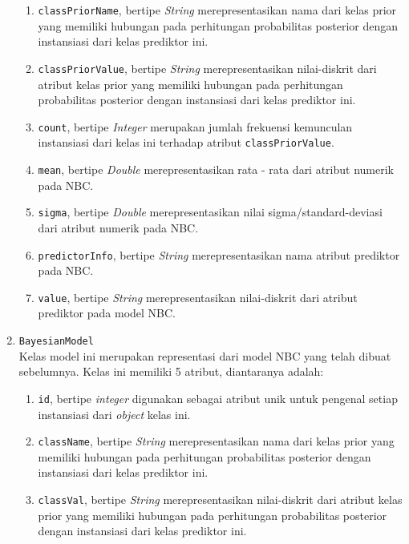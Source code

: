 \begin{enumerate}
\begin{enumerate}
		\item \texttt{classPriorName}, bertipe \textit{String} merepresentasikan nama dari kelas prior yang memiliki hubungan pada perhitungan probabilitas posterior dengan instansiasi dari kelas prediktor ini.
		
		\item \texttt{classPriorValue}, bertipe \textit{String} merepresentasikan nilai-diskrit dari atribut kelas prior yang memiliki hubungan pada perhitungan probabilitas posterior dengan instansiasi dari kelas prediktor ini.
		
		\item \texttt{count}, bertipe \textit{Integer} merupakan jumlah frekuensi kemunculan instansiasi dari kelas ini terhadap atribut \texttt{classPriorValue}.
		
		\item \texttt{mean}, bertipe \textit{Double} merepresentasikan rata - rata dari atribut numerik pada NBC.
		
		\item \texttt{sigma}, bertipe \textit{Double} merepresentasikan nilai sigma/standard-deviasi dari atribut numerik pada NBC.
		
		\item \texttt{predictorInfo}, bertipe \textit{String} merepresentasikan nama atribut prediktor pada NBC.
		
		\item \texttt{value}, bertipe \textit{String} merepresentasikan nilai-diskrit dari atribut prediktor pada model NBC.
		
		
	\end{enumerate}

	\item \texttt{BayesianModel}\\
	Kelas model ini merupakan representasi dari model NBC yang telah dibuat sebelumnya. Kelas ini memiliki 5 atribut, diantaranya adalah:
	\begin{enumerate}
		\item \texttt{id}, bertipe \textit{integer} digunakan sebagai atribut unik untuk pengenal setiap instansiasi dari \textit{object} kelas ini.
		
		\item \texttt{className}, bertipe \textit{String} merepresentasikan nama dari kelas prior yang memiliki hubungan pada perhitungan probabilitas posterior dengan instansiasi dari kelas prediktor ini.

		\item \texttt{classVal}, bertipe \textit{String} merepresentasikan nilai-diskrit dari atribut kelas prior yang memiliki hubungan pada perhitungan probabilitas posterior dengan instansiasi dari kelas prediktor ini.
		

\end{enumerate}
\end{enumerate}
